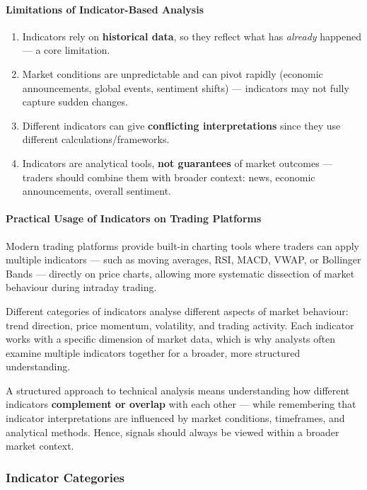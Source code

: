\documentclass[12pt,openany]{book}
\begin{document}
\paragraph{Limitations of Indicator-Based Analysis}

\begin{enumerate}[leftmargin=*]
    \item Indicators rely on \textbf{historical data}, so they reflect what has \emph{already} happened --- a core limitation.
    \item Market conditions are unpredictable and can pivot rapidly (economic announcements, global events, sentiment shifts) --- indicators may not fully capture sudden changes.
    \item Different indicators can give \textbf{conflicting interpretations} since they use different calculations/frameworks.
    \item Indicators are analytical tools, \textbf{not guarantees} of market outcomes --- traders should combine them with broader context: news, economic announcements, overall sentiment.
\end{enumerate}

\paragraph{Practical Usage of Indicators on Trading Platforms}

Modern trading platforms provide built-in charting tools where traders can apply multiple indicators --- such as moving averages, RSI, MACD, VWAP, or Bollinger Bands --- directly on price charts, allowing more systematic dissection of market behaviour during intraday trading.

Different categories of indicators analyse different aspects of market behaviour: trend direction, price momentum, volatility, and trading activity. Each indicator works with a specific dimension of market data, which is why analysts often examine multiple indicators together for a broader, more structured understanding.

A structured approach to technical analysis means understanding how different indicators \textbf{complement or overlap} with each other --- while remembering that indicator interpretations are influenced by market conditions, timeframes, and analytical methods. Hence, signals should always be viewed within a broader market context.

\subsubsection{Indicator Categories}
\end{document}
